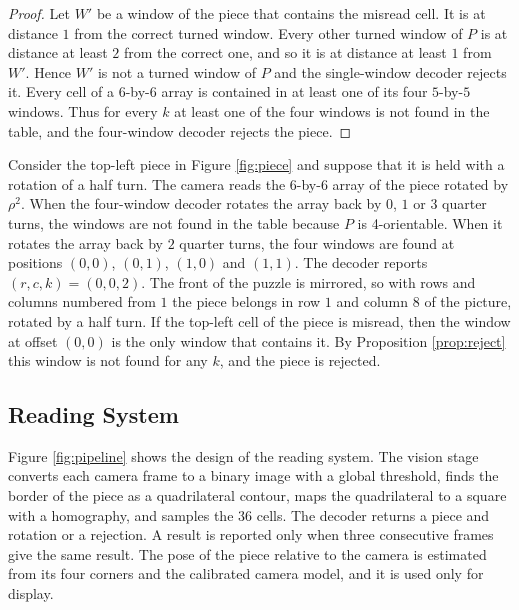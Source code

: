 \documentclass{lipics-v2021}
\begin{document}
\begin{proof}
Let $W'$ be a window of the piece that contains the misread cell.
It is at distance $1$ from the correct turned window.
Every other turned window of $P$ is at distance at least $2$ from the correct one, and so it is at distance at least $1$ from $W'$.
Hence $W'$ is not a turned window of $P$ and the single-window decoder rejects it.
Every cell of a $6$-by-$6$ array is contained in at least one of its four $5$-by-$5$ windows.
Thus for every $k$ at least one of the four windows is not found in the table, and the four-window decoder rejects the piece.
\end{proof}

\begin{example} \label{ex:piece}
Consider the top-left piece in Figure \ref{fig:piece} and suppose that it is held with a rotation of a half turn.
The camera reads the $6$-by-$6$ array of the piece rotated by $\rho^2$.
When the four-window decoder rotates the array back by $0$, $1$ or $3$ quarter turns, the windows are not found in the table because $P$ is 4-orientable.
When it rotates the array back by $2$ quarter turns, the four windows are found at positions $(0,0)$, $(0,1)$, $(1,0)$ and $(1,1)$.
The decoder reports $(r,c,k) = (0,0,2)$.
The front of the puzzle is mirrored, so with rows and columns numbered from $1$ the piece belongs in row $1$ and column $8$ of the picture, rotated by a half turn.
If the top-left cell of the piece is misread, then the window at offset $(0,0)$ is the only window that contains it.
By Proposition \ref{prop:reject} this window is not found for any $k$, and the piece is rejected.
\end{example}

\subsection{Reading System}
\label{sec:jigsaw_system}

Figure \ref{fig:pipeline} shows the design of the reading system.
The vision stage converts each camera frame to a binary image with a global threshold, finds the border of the piece as a quadrilateral contour, maps the quadrilateral to a square with a homography, and samples the $36$ cells.
The decoder returns a piece and rotation or a rejection.
A result is reported only when three consecutive frames give the same result.
The pose of the piece relative to the camera is estimated from its four corners and the calibrated camera model, and it is used only for display.
\end{document}
